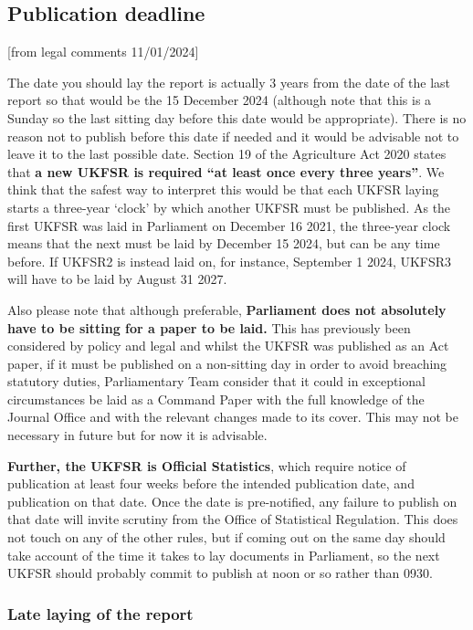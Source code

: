 \documentclass[
]{book}
\begin{document}
\hypertarget{publication-deadline}{%
\subsection{Publication deadline}\label{publication-deadline}}

{[}from legal comments 11/01/2024{]}

The date you should lay the report is actually 3 years from the date of the last
report so that would be the 15 December 2024 (although note that this is a
Sunday so the last sitting day before this date would be appropriate). There is
no reason not to publish before this date if needed and it would be advisable
not to leave it to the last possible date. Section 19 of the Agriculture Act
2020 states that \textbf{a new UKFSR is required ``at least once every three years''}. We
think that the safest way to interpret this would be that each UKFSR laying
starts a three-year `clock' by which another UKFSR must be published. As the
first UKFSR was laid in Parliament on December 16 2021, the three-year clock
means that the next must be laid by December 15 2024, but can be any time
before. If UKFSR2 is instead laid on, for instance, September 1 2024, UKFSR3
will have to be laid by August 31 2027.

Also please note that although preferable, \textbf{Parliament does not absolutely have
to be sitting for a paper to be laid.} This has previously been considered by
policy and legal and whilst the UKFSR was published as an Act paper, if it must
be published on a non-sitting day in order to avoid breaching statutory duties,
Parliamentary Team consider that it could in exceptional circumstances be laid
as a Command Paper with the full knowledge of the Journal Office and with the
relevant changes made to its cover. This may not be necessary in future but for
now it is advisable.

\textbf{Further, the UKFSR is Official Statistics}, which require notice of publication
at least four weeks before the intended publication date, and publication on
that date. Once the date is pre-notified, any failure to publish on that date
will invite scrutiny from the Office of Statistical Regulation. This does not
touch on any of the other rules, but if coming out on the same day should take
account of the time it takes to lay documents in Parliament, so the next UKFSR
should probably commit to publish at noon or so rather than 0930.

\hypertarget{late-laying-of-the-report}{%
\subsubsection{Late laying of the report}\label{late-laying-of-the-report}}
\end{document}
